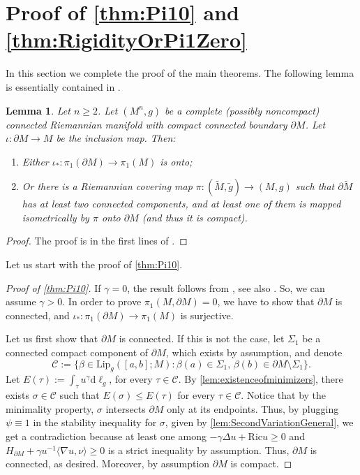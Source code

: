 \documentclass[12pt,a4paper,reqno]{amsart}
\newtheorem{lemma}{Lemma}
\theoremstyle{definition}
\renewcommand{\leq}{\leqslant}
\renewcommand{\geq}{\geqslant}
\renewcommand{\tilde}{\widetilde}
\begin{document}
{\section{Proof of \cref{thm:Pi10} and \cref{thm:RigidityOrPi1Zero}}\label{sec:proofs}

In this section we complete the proof of the main theorems. The following lemma is essentially contained in \cite{Galloway}.
\begin{lemma}\label{lem:Galloway}
    Let $n\geq 2$. Let $(M^n,g)$ be a complete (possibly noncompact) connected Riemannian manifold with compact connected boundary $\partial M$. Let $\iota:\partial M\to M$ be the inclusion map. Then:
    \begin{enumerate}
        \item Either $\iota_*:\pi_1(\partial M)\to \pi_1(M)$ is onto;
        \item Or there is a Riemannian covering map $\pi:(\tilde M,\tilde g)\to (M,g)$ such that $\partial\tilde M$ has at least two connected components, and at least one of them is mapped isometrically by $\pi$ onto $\partial M$ (and thus it is compact).
    \end{enumerate}
\end{lemma}
\begin{proof}
    The proof is in the first lines of \cite[Proof of Lemma 2]{Galloway}.
\end{proof}
Let us start with the proof of \cref{thm:Pi10}.

\begin{proof}[Proof of \cref{thm:Pi10}]
    If $\gamma=0$, the result follows from \cite[Proposition 2.8]{FraserLi}, see also \cite{LawsonUnknot}. So, we can assume $\gamma>0$. In order to prove $\pi_1(M,\partial M)=0$, we have to show that $\partial M$ is connected, and $\iota_*:\pi_1(\partial M)\to \pi_1(M)$ is surjective. 
    
    Let us first show that $\partial M$ is connected. If this is not the case, let $\Sigma_1$ be a connected compact component of $\partial M$, which exists by assumption, and denote
\[
\mathcal{C}:=\Big\{\beta\in \mathrm{Lip}_g([a,b];M):\beta(a)\in \Sigma_1,\, \beta(b) \in \partial M \setminus \Sigma_1\Big\}.
\]
Let $E(\tau):=\int_\tau u^\gamma\mathrm{d}\ell_g$, for every $\tau\in \mathcal{C}$. By \cref{lem:existenceofminimizers}, 
there exists $\sigma\in\mathcal{C}$ such that $E(\sigma)\leq E(\tau)$ for every $\tau\in \mathcal{C}$. Notice that by the minimality property, $\sigma$ intersects $\partial M$ only at its endpoints. Thus, by plugging $\psi\equiv 1$ in the stability inequality for $\sigma$, given by \cref{lem:SecondVariationGeneral}, we get a contradiction because at least one among $-\gamma\Delta u+\mathrm{Ric}u\geq 0$ and $H_{\partial M}+\gamma u^{-1}\langle\nabla u,\nu\rangle\geq 0$ is a strict inequality by assumption. Thus, $\partial M$ is connected, as desired. Moreover, by assumption $\partial M$ is compact.


\end{proof}}
\end{document}
